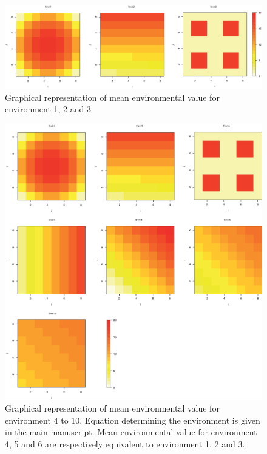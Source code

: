 \documentclass[a4paper,times,10pt,authoryear]{article}%
\begin{document}
\begin{figure}[t]
\begin{center}
\includegraphics[height=0.25\textheight]{figures/simulatedenvironment.eps}
\end{center}
\caption{Graphical representation of mean environmental value for environment 1, 2 and 3}%
\label{fig:simulatedenvir}%
\end{figure}

\begin{figure}[t]
\begin{center}
\includegraphics[height=0.8\textheight]{figures/environmentaldata.eps}
\end{center}
\caption{Graphical representation of mean environmental value for environment 4 to 10. Equation determining the environment is given in the main manuscript. Mean environmental value for environment 4, 5 and 6 are respectively equivalent to environment 1, 2 and 3.}%
\label{fig:environmentaldata}%
\end{figure}
\end{document}
